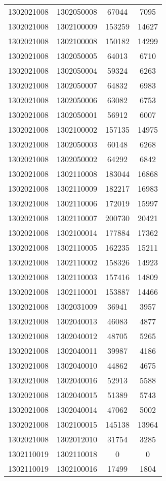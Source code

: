\begin{longtable}{llcc}
1302021008 & 1302050008 & 67044 & 7095\\
1302021008 & 1302100009 & 153259 & 14627\\
1302021008 & 1302100008 & 150182 & 14299\\
1302021008 & 1302050005 & 64013 & 6710\\
1302021008 & 1302050004 & 59324 & 6263\\
1302021008 & 1302050007 & 64832 & 6983\\
1302021008 & 1302050006 & 63082 & 6753\\
1302021008 & 1302050001 & 56912 & 6007\\
1302021008 & 1302100002 & 157135 & 14975\\
1302021008 & 1302050003 & 60148 & 6268\\
1302021008 & 1302050002 & 64292 & 6842\\
1302021008 & 1302110008 & 183044 & 16868\\
1302021008 & 1302110009 & 182217 & 16983\\
1302021008 & 1302110006 & 172019 & 15997\\
1302021008 & 1302110007 & 200730 & 20421\\
1302021008 & 1302100014 & 177884 & 17362\\
1302021008 & 1302110005 & 162235 & 15211\\
1302021008 & 1302110002 & 158326 & 14923\\
1302021008 & 1302110003 & 157416 & 14809\\
1302021008 & 1302110001 & 153887 & 14466\\
1302021008 & 1302031009 & 36941 & 3957\\
1302021008 & 1302040013 & 46083 & 4877\\
1302021008 & 1302040012 & 48705 & 5265\\
1302021008 & 1302040011 & 39987 & 4186\\
1302021008 & 1302040010 & 44862 & 4675\\
1302021008 & 1302040016 & 52913 & 5588\\
1302021008 & 1302040015 & 51389 & 5743\\
1302021008 & 1302040014 & 47062 & 5002\\
1302021008 & 1302100015 & 145138 & 13964\\
1302021008 & 1302012010 & 31754 & 3285\\
1302110019 & 1302110018 & 0 & 0\\
1302110019 & 1302100016 & 17499 & 1804\\

\end{longtable}
